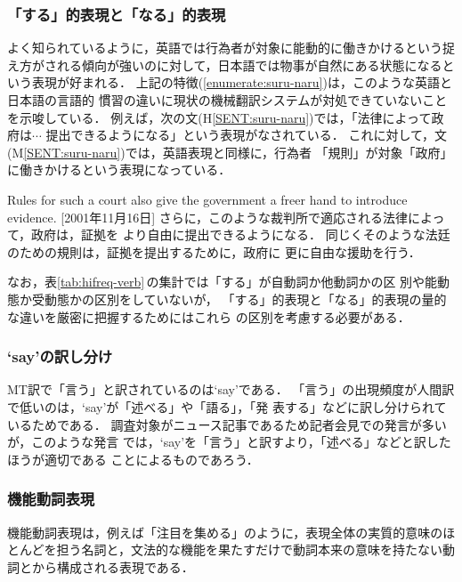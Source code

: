 \subsubsection{「する」的表現と「なる」的表現}

よく知られているように，英語では行為者が対象に能動的に働きかけるという捉
え方がされる傾向が強いのに対して，日本語では物事が自然にある状態になると
いう表現が好まれる\cite{Ikegami81,Anzai83}．
上記の特徴(\ref{enumerate:suru-naru})は，このような英語と日本語の言語的
慣習の違いに現状の機械翻訳システムが対処できていないことを示唆している．
例えば，次の文(H\ref{SENT:suru-naru})では，「法律によって政府は$\cdots$
提出できるようになる」という表現がなされている．
これに対して，文(M\ref{SENT:suru-naru})では，英語表現と同様に，行為者
「規則」が対象「政府」に働きかけるという表現になっている．
\begin{SENT2}
\sentE Rules for such a court also give the government a freer hand to 
introduce evidence. [2001年11月16日]
\sentH さらに，このような裁判所で適応される法律によって，政府は，証拠を
より自由に提出できるようになる．
\sentM 同じくそのような法廷のための規則は，証拠を提出するために，政府に
更に自由な援助を行う． 
\label{SENT:suru-naru}
\end{SENT2}
なお，表\ref{tab:hifreq-verb}\,の集計では「する」が自動詞か他動詞かの区
別や能動態か受動態かの区別をしていないが，
「する」的表現と「なる」的表現の量的な違いを厳密に把握するためにはこれら
の区別を考慮する必要がある．


\subsubsection{`say'の訳し分け}

MT訳で「言う」と訳されているのは`say'である．
「言う」の出現頻度が人間訳で低いのは，`say'が「述べる」や「語る」，「発
表する」などに訳し分けられているためである．
調査対象がニュース記事であるため記者会見での発言が多いが，このような発言
では，`say'を「言う」と訳すより，「述べる」などと訳したほうが適切である
ことによるものであろう．


\subsubsection{機能動詞表現}

機能動詞表現は，例えば「注目を集める」のように，表現全体の実質的意味のほ
とんどを担う名詞と，文法的な機能を果たすだけで動詞本来の意味を持たない動
詞とから構成される表現である\cite{Muraki91}．


